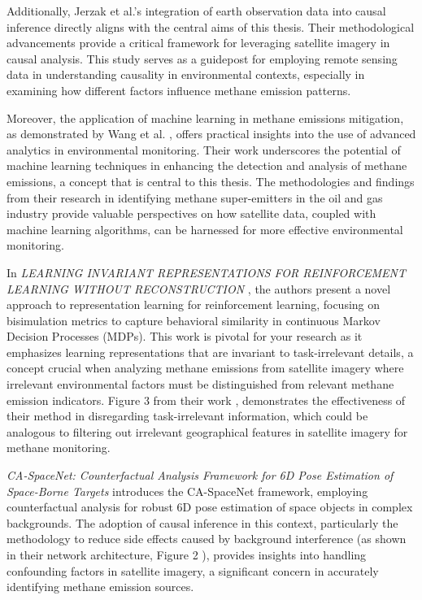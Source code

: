 Additionally, Jerzak et al.'s \cite{jerzak2023} integration of earth observation data into causal inference directly aligns with the central aims of this thesis. Their methodological advancements provide a critical framework for leveraging satellite imagery in causal analysis. This study serves as a guidepost for employing remote sensing data in understanding causality in environmental contexts, especially in examining how different factors influence methane emission patterns.

Moreover, the application of machine learning in methane emissions mitigation, as demonstrated by Wang et al. \cite{wang2020}, offers practical insights into the use of advanced analytics in environmental monitoring. Their work underscores the potential of machine learning techniques in enhancing the detection and analysis of methane emissions, a concept that is central to this thesis. The methodologies and findings from their research in identifying methane super-emitters in the oil and gas industry provide valuable perspectives on how satellite data, coupled with machine learning algorithms, can be harnessed for more effective environmental monitoring.


In \textit{LEARNING INVARIANT REPRESENTATIONS FOR REINFORCEMENT LEARNING WITHOUT RECONSTRUCTION} \cite{zhang_learning_2021}, the authors present a novel approach to representation learning for reinforcement learning, focusing on bisimulation metrics to capture behavioral similarity in continuous Markov Decision Processes (MDPs). This work is pivotal for your research as it emphasizes learning representations that are invariant to task-irrelevant details, a concept crucial when analyzing methane emissions from satellite imagery where irrelevant environmental factors must be distinguished from relevant methane emission indicators. Figure 3 from their work \cite[Figure 3]{zhang_learning_2021}, demonstrates the effectiveness of their method in disregarding task-irrelevant information, which could be analogous to filtering out irrelevant geographical features in satellite imagery for methane monitoring.

\textit{CA-SpaceNet: Counterfactual Analysis Framework for 6D Pose Estimation of Space-Borne Targets} \cite{wang_ca-spacenet_2022} introduces the CA-SpaceNet framework, employing counterfactual analysis for robust 6D pose estimation of space objects in complex backgrounds. The adoption of causal inference in this context, particularly the methodology to reduce side effects caused by background interference (as shown in their network architecture, Figure 2 \cite[Figure 2]{wang_ca-spacenet_2022}), provides insights into handling confounding factors in satellite imagery, a significant concern in accurately identifying methane emission sources.

